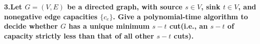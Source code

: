 
\chapter{}
\textbf{
3.Let $G=(V,E)$ be a directed graph, with source $s\in V$, sink $t\in V$, and nonegative edge capacities $\{c_e\}$. Give a polynomial-time algorithm to decide whether $G$ has a unique minimum $s-t$ cut(i.e., an $s-t$ of capacity strictly less than that of all other $s-t$ cuts).
}





